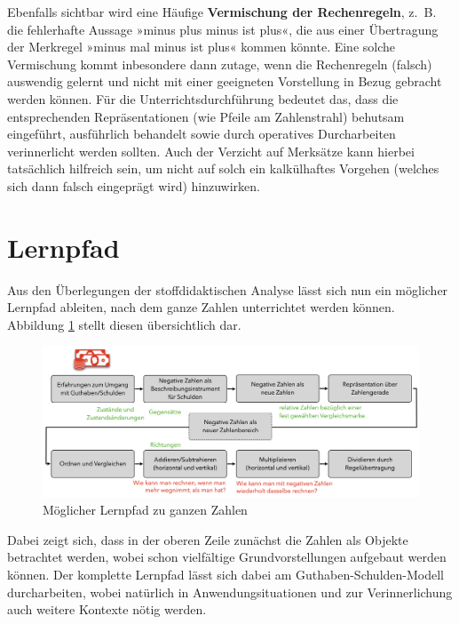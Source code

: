 \documentclass[
]{scrbook}
\theoremstyle{definition}
\theoremstyle{definition}
\theoremstyle{definition}
\theoremstyle{definition}
\theoremstyle{remark}
\begin{document}
\begin{itemize}
  Ebenfalls sichtbar wird eine Häufige \textbf{Vermischung der Rechenregeln}, z.~B. die fehlerhafte Aussage »minus plus minus ist plus«, die aus einer Übertragung der Merkregel »minus mal minus ist plus« kommen könnte. Eine solche Vermischung kommt inbesondere dann zutage, wenn die Rechenregeln (falsch) auswendig gelernt und nicht mit einer geeigneten Vorstellung in Bezug gebracht werden können. \textcolor{empiricColor}{Für die Unterrichtsdurchführung bedeutet das, dass die entsprechenden Repräsentationen (wie Pfeile am Zahlenstrahl) behutsam eingeführt, ausführlich behandelt sowie durch operatives Durcharbeiten verinnerlicht werden sollten. Auch der Verzicht auf Merksätze kann hierbei tatsächlich hilfreich sein, um nicht auf solch ein kalkülhaftes Vorgehen (welches sich dann falsch eingeprägt wird) hinzuwirken.}
\end{itemize}

\hypertarget{lernpfad}{%
\section{Lernpfad}\label{lernpfad}}

Aus den Überlegungen der stoffdidaktischen Analyse lässt sich nun ein möglicher Lernpfad ableiten, nach dem ganze Zahlen unterrichtet werden können. Abbildung \ref{fig:Lernpfad} stellt diesen übersichtlich dar.

\begin{figure}

{\centering \includegraphics[width=1\linewidth]{pictures/9-Lernpfad} 

}

\caption{Möglicher Lernpfad zu ganzen Zahlen}\label{fig:Lernpfad}
\end{figure}

Dabei zeigt sich, dass in der oberen Zeile zunächst die Zahlen als Objekte betrachtet werden, wobei schon vielfältige Grundvorstellungen aufgebaut werden können. Der komplette Lernpfad lässt sich dabei am Guthaben-Schulden-Modell durcharbeiten, wobei natürlich in Anwendungsituationen und zur Verinnerlichung auch weitere Kontexte nötig werden.
\end{document}
